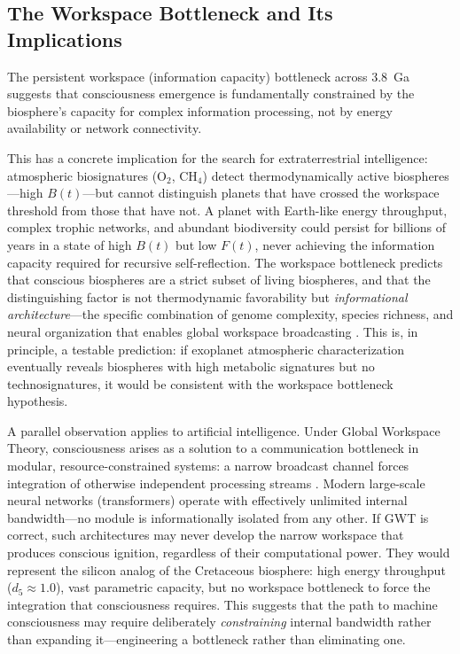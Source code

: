 \documentclass[10pt,letterpaper]{article}
\begin{document}
\subsection*{The Workspace Bottleneck and Its Implications}

The persistent workspace (information capacity) bottleneck across 3.8~Ga
suggests that consciousness emergence is fundamentally constrained by the
biosphere's capacity for complex information processing, not by energy
availability or network connectivity.

This has a concrete implication for the search for extraterrestrial
intelligence: atmospheric biosignatures ($\text{O}_2$, $\text{CH}_4$) detect
thermodynamically active biospheres---high $B(t)$---but cannot distinguish
planets that have crossed the workspace threshold from those that have not.
A planet with Earth-like energy throughput, complex trophic networks, and
abundant biodiversity could persist for billions of years in a state of
high $B(t)$ but low $F(t)$, never achieving the information capacity
required for recursive self-reflection. The workspace bottleneck predicts
that conscious biospheres are a strict subset of living biospheres, and that
the distinguishing factor is not thermodynamic favorability but
\emph{informational architecture}---the specific combination of genome
complexity, species richness, and neural organization that enables global
workspace broadcasting \cite{baars1988}. This is, in principle, a testable
prediction: if exoplanet atmospheric characterization eventually reveals
biospheres with high metabolic signatures but no technosignatures, it would
be consistent with the workspace bottleneck hypothesis.

A parallel observation applies to artificial intelligence. Under Global
Workspace Theory, consciousness arises as a solution to a communication
bottleneck in modular, resource-constrained systems: a narrow broadcast
channel forces integration of otherwise independent processing streams
\cite{baars1988}. Modern large-scale neural networks (transformers) operate
with effectively unlimited internal bandwidth---no module is informationally
isolated from any other. If GWT is correct, such architectures may never
develop the narrow workspace that produces conscious ignition, regardless of
their computational power. They would represent the silicon analog of the
Cretaceous biosphere: high energy throughput ($d_5 \approx 1.0$), vast
parametric capacity, but no workspace bottleneck to force the integration
that consciousness requires. This suggests that the path to machine
consciousness may require deliberately \emph{constraining} internal
bandwidth rather than expanding it---engineering a bottleneck rather than
eliminating one.
\end{document}
